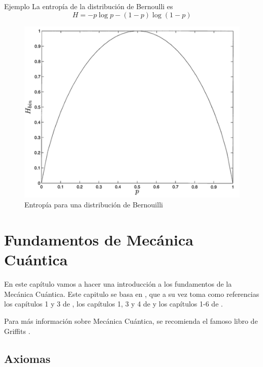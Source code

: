 \documentclass[a4paper,11pt]{book} %
\numberwithin{equation}{chapter}
\begin{document}
	\begin{mybox_green}{Ejemplo}
	La entropía de la distribución de Bernoulli es 
	\begin{equation}
	H = - p\log p -(1-p)\log (1-p)
	\end{equation}
	
		\begin{figure}[H]
		\centering 
		\includegraphics[width=0.5\linewidth]{Figuras/Fig_formalismo_binaryentropy.png}
		\caption{Entropía para una distribución de Bernouilli}
		\label{Fig_formalismo_binaryentropy}
		\end{figure}
	\end{mybox_green}
	
















\chapter{Fundamentos de Mecánica Cuántica} \label{sec_chapter_fundamentos}

En este capítulo vamos a hacer una introducción a los fundamentos de la Mecánica Cuántica. Este capitulo se basa en \cite{bib_Curso-JMas}, que a su vez toma como referencias los capítulos 1 y 3 de \cite{bib_Claude}, los capítulos 1, 3 y 4 de \cite{bib_le_bellac_2006} y los capítulos 1-6 de \cite{bib_fayngold2013quantum}. 

Para más información sobre Mecánica Cuántica, se recomienda el famoso libro de Griffits \cite{bib_griffiths_schroeter_2018}.

	\section{Axiomas}
\end{document}
